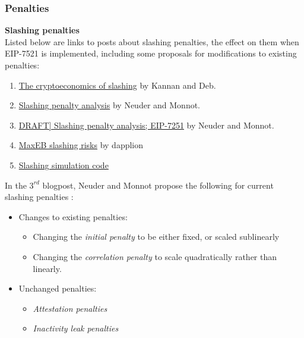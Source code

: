 \subsubsection{Penalties}
\textbf{Slashing penalties} \\
\noindent
Listed below are links to posts about slashing penalties, the effect on them when EIP-7521 is implemented, including some proposals for modifications to existing penalties:
\begin{enumerate}
\item \href{https://a16zcrypto.com/posts/article/the-cryptoeconomics-of-slashing/}{The cryptoeconomics of slashing} by Kannan and Deb.
\item \href{https://ethresear.ch/t/slashing-penalty-analysis-eip-7251/16509}{Slashing penalty analysis} by Neuder and Monnot.
\item \href{https://notes.ethereum.org/@mikeneuder/slashings-eip-7251}{DRAFT] Slashing penalty analysis; EIP-7251} by Neuder and Monnot.
\item \href{https://hackmd.io/@dapplion/maxeb_slashing_risks}{MaxEB slashing risks} by dapplion
\item \href{https://colab.research.google.com/drive/1lBe4qH4oqI8D9cmcQGca3O1AdR3SVr5z?usp=sharing#scrollTo=Hiw1NPEZIQVi}{Slashing simulation code}
\end{enumerate}


\noindent
In the $3^{rd}$ blogpost, Neuder and Monnot propose the following for current slashing penalties \cite{Neuder2023d}: 
\begin{itemize}
\item Changes to existing penalties:
	\begin{itemize}
	\item Changing the \textit{initial penalty} to be either fixed, or scaled sublinearly
	\item Changing the \textit{correlation penalty} to scale quadratically rather than linearly.
	\end{itemize}
\item Unchanged penalties:
	\begin{itemize}
	\item \textit{Attestation penalties}
	\item \textit{Inactivity leak penalties}
	\end{itemize}
\end{itemize}

